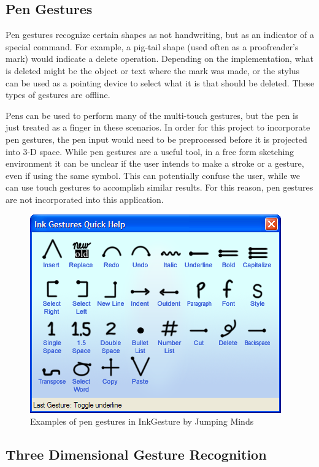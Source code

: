 \documentclass[11pt]{report}
\begin{document}
\subsection{Pen Gestures}

Pen gestures recognize certain shapes as not handwriting, but as an indicator of a special command.
For example, a pig-tail shape (used often as a proofreader's mark) would indicate a delete operation. 
Depending on the implementation, what is deleted might be the object or text where the mark was made, or the stylus can be used as a pointing device to select what it is that should be deleted.
These types of gestures are offline.

Pens can be used to perform many of the multi-touch gestures, but the pen is just treated as a finger in these scenarios.
In order for this project to incorporate pen gestures, the pen input would need to be preprocessed before it is projected into 3-D space.
While pen gestures are a useful tool, in a free form sketching environment it can be unclear if the user intends to make a stroke or a gesture, even if using the same symbol.
This can potentially confuse the user, while we can use touch gestures to accomplish similar results.
For this reason, pen gestures are not incorporated into this application.


\begin{figure}
\includegraphics[width=\textwidth]{pen-gestures}
\caption{Examples of pen gestures in InkGesture by Jumping Minds}
\end{figure}

\subsection{Three Dimensional Gesture Recognition}
\end{document}
